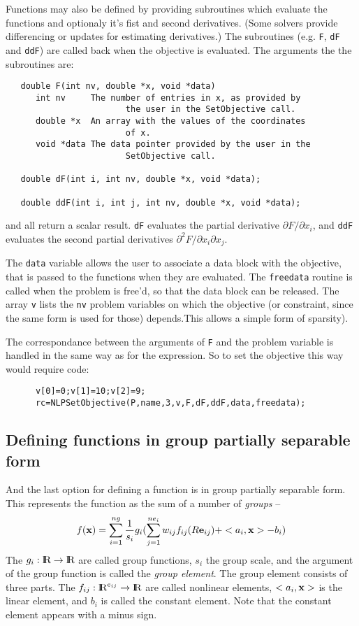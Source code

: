 \documentclass[12pt]{article}
\def\R{\hbox{\rm I\kern-.2150em R}}
\def\into{\rightarrow}
\begin{document}
     Functions may also be defined by providing subroutines which evaluate the functions and optionaly it's
     fist and second derivatives. (Some solvers provide differencing or updates for estimating derivatives.)
     The subroutines (e.g. {\tt F}, {\tt dF} and {\tt ddF}) are called back when the objective is evaluated. The
     arguments the the subroutines are:
     \begin{verbatim}
   double F(int nv, double *x, void *data)
      int nv     The number of entries in x, as provided by
                        the user in the SetObjective call.
      double *x  An array with the values of the coordinates
                        of x.
      void *data The data pointer provided by the user in the
                        SetObjective call.

   double dF(int i, int nv, double *x, void *data);

   double ddF(int i, int j, int nv, double *x, void *data);
     \end{verbatim}
     and all return a scalar result. {\tt dF} evaluates the partial derivative $\partial F/\partial x_i$, 
     and {\tt ddF} evaluates the second partial derivatives $\partial^2 F/\partial x_i\partial x_j$.

     The {\tt data} variable allows the user to associate a data block with the objective, that is passed to the
     functions when they are evaluated. The {\tt freedata} routine is called when the problem is free'd, so that
     the data block can be released. The array {\tt v} lists the {\tt nv} problem variables on which the objective
     (or constraint, since the same form is used for those) depends.This allows
     a simple form of sparsity).

     The correspondance between the arguments of {\tt F} and the problem variable is handled in the same
     way as for the expression. So to set the objective this way would require code:
     \begin{verbatim}
      v[0]=0;v[1]=10;v[2]=9;
      rc=NLPSetObjective(P,name,3,v,F,dF,ddF,data,freedata);
     \end{verbatim}

    \subsection{Defining functions in group partially separable form}

    And the last option for defining a function is in group partially separable form. This represents the
    function as the sum of a number of {\it groups} --
    \begin{displaymath}
     f({\bf x}) = \sum_{i=1}^{ng} {1\over s_i}g_i( \sum_{j=1}^{ne_i} w_{ij} f_{ij}(R {\bf e}_{ij}) 
             + <a_i,{\bf x}> - b_i)
    \end{displaymath}
    The $g_i:\R\into\R$ are called group functions, $s_i$ the group scale, and the argument of the
    group function is called the {\it group element}. The group element consists of three parts. 
    The $f_{ij}:\R^{e_{ij}}\into\R$ are called nonlinear elements, $<a_i,{\bf x}>$ is the linear element,
    and $b_i$ is called the constant element. Note that the constant element appears with a minus sign.
\end{document}
